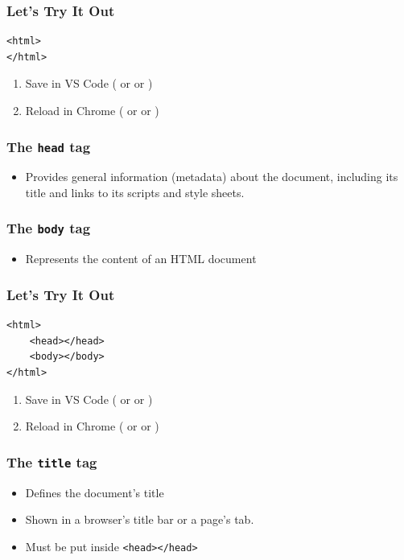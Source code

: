 \documentclass[12pt]{beamer}
\begin{document}
\begin{frame}[fragile]
\frametitle{Let's Try It Out}
\begin{verbatim}
<html>
</html>
\end{verbatim}
\begin{enumerate}
	\item Save in VS Code ( or  or )
	\item Reload in Chrome ( or  or )
\end{enumerate}
\end{frame}

\begin{frame}
\frametitle{The \texttt{head} tag}
\begin{itemize}
	\item Provides general information (metadata) about the document, including its title and links to its scripts and style sheets.\footnotemark
\end{itemize}
\end{frame}

\begin{frame}
\frametitle{The \texttt{body} tag}
\begin{itemize}
	\item Represents the content of an HTML document \footnotemark
\end{itemize}
\end{frame}

\begin{frame}[fragile]
\frametitle{Let's Try It Out}
\begin{verbatim}
<html>
	<head></head>
	<body></body>
</html>
\end{verbatim}
\begin{enumerate}
	\item Save in VS Code ( or  or )
	\item Reload in Chrome ( or  or )
\end{enumerate}
\end{frame}

\begin{frame}
\frametitle{The \texttt{title} tag}
\begin{itemize}
	\item Defines the document's title\footnotemark
	\item Shown in a browser's title bar or a page's tab.
	\item Must be put inside \texttt{<head></head>}
\end{itemize}
\end{frame}
\end{document}
